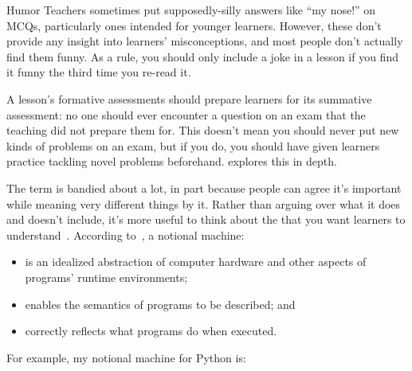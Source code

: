 \begin{aside}{Humor}
  Teachers sometimes put supposedly-silly answers like ``my nose!'' on MCQs,
  particularly ones intended for younger learners.
  However,
  these don't provide any insight into learners' misconceptions,
  and most people don't actually find them funny.
  As a rule,
  you should only include a joke in a lesson if you find it funny
  the third time you re-read it.
\end{aside}

A lesson's formative assessments should prepare learners for its summative assessment:
no one should ever encounter a question on an exam that the teaching did not prepare them for.
This doesn't mean you should never put new kinds of problems on an exam,
but if you do,
you should have given learners practice tackling novel problems beforehand.
 explores this in depth.


The term  is bandied about a lot,
in part because people can agree it's important while meaning very different things by it.
Rather than arguing over what it does and doesn't include,
it's more useful to think about the 
that you want learners to understand~\cite{DuBo1986}.
According to~\cite{Sorv2013},
a notional machine:

\begin{itemize}

\item
  is an idealized abstraction of computer hardware
  and other aspects of programs' runtime environments;

\item
  enables the semantics of programs to be described;
  and

\item
  correctly reflects what programs do when executed.

\end{itemize}

\noindent
For example, my notional machine for Python is:

